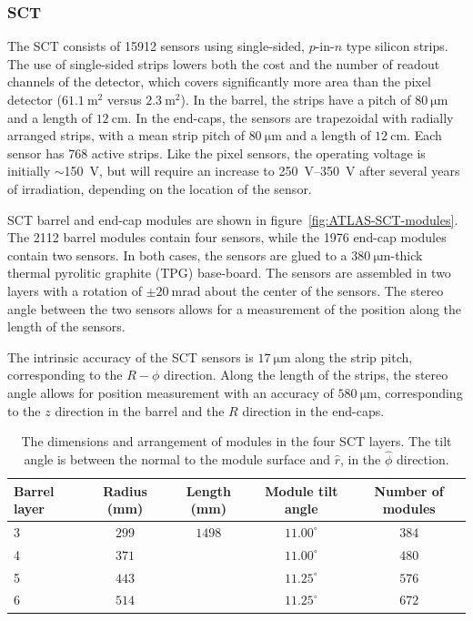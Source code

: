 \subsubsection{SCT}\label{sec:ATLAS-id-sct}

The SCT consists of 15912 sensors using single-sided, $p$-in-$n$ type silicon strips. The use of single-sided strips lowers both the cost and the number of readout channels of the detector, which covers significantly more area than the pixel detector ($\SI{61.1}{\meter\tothe{2}}$ versus $\SI{2.3}{\meter\tothe{2}}$). In the barrel, the strips have a pitch of $\SI{80}{\micro\meter}$ and a length of $\SI{12}{\centi\meter}$. In the end-caps, the sensors are trapezoidal with radially arranged strips, with a mean strip pitch of $\SI{80}{\micro\meter}$ and a length of $\SI{12}{\centi\meter}$. Each sensor has 768 active strips. Like the pixel sensors, the operating voltage is initially $\sim$\SI{150}{\volt}, but will require an increase to \SIrange[range-phrase=-]{250}{350}{\volt} after several years of irradiation, depending on the location of the sensor. 

SCT barrel and end-cap modules are shown in figure~\ref{fig:ATLAS-SCT-modules}. The 2112 barrel modules contain four sensors, while the 1976 end-cap modules contain two sensors. In both cases, the sensors are glued to a $\SI{380}{\micro\meter}$-thick thermal pyrolitic graphite (TPG) base-board. The sensors are assembled in two layers with a rotation of $\pm\SI{20}{\milli\radian}$ about the center of the sensors. The stereo angle between the two sensors allows for a measurement of the position along the length of the sensors. 


The intrinsic accuracy of the SCT sensors is $\SI{17}{\micro\meter}$ along the strip pitch, corresponding to the $R-\phi$ direction. Along the length of the strips, the stereo angle allows for position measurement with an accuracy of $\SI{580}{\micro\meter}$, corresponding to the $z$ direction in the barrel and the $R$ direction in the end-caps.

\begin{table}[htbp]
	\centering
	\scriptsize
	\begin{tabular}{|l|c|c|c|c|}
		\hline
		\textbf{Barrel layer} & \textbf{Radius (mm)} & \textbf{Length (mm)} & \textbf{Module tilt angle} & \textbf{Number of modules} \\
		\hline
		3 & $299$ & $1498$ & $11.00^{\circ}$ & $384$ \\
		4 & $371$ & & $11.00^{\circ}$ & $480$ \\
		5 & $443$ & & $11.25^{\circ}$ & $576$ \\
		6 & $514$ & & $11.25^{\circ}$ & $672$ \\
		\hline
	\end{tabular}
	\caption{The dimensions and arrangement of modules in the four SCT layers. The tilt angle is between the normal to the module surface and $\hat{r}$, in the $\hat{\phi}$ direction.}
	\label{fig:ATLAS-SCT-layout}
\end{table}

